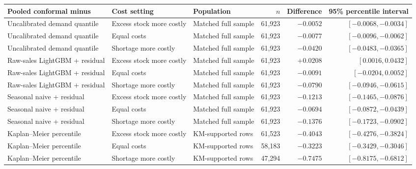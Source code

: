 \begin{tabular}{@{}lllrrr@{}}
\toprule
Pooled conformal minus & Cost setting & Population & $n$ & Difference & 95\% percentile interval \\
\midrule
Uncalibrated demand quantile & Excess stock more costly & Matched full sample & 61,923 & $-0.0052$ & $[-0.0068, -0.0034]$ \\
Uncalibrated demand quantile & Equal costs & Matched full sample & 61,923 & $-0.0077$ & $[-0.0096, -0.0062]$ \\
Uncalibrated demand quantile & Shortage more costly & Matched full sample & 61,923 & $-0.0420$ & $[-0.0483, -0.0365]$ \\
\addlinespace
Raw-sales LightGBM + residual & Excess stock more costly & Matched full sample & 61,923 & $+0.0208$ & $[0.0016, 0.0432]$ \\
Raw-sales LightGBM + residual & Equal costs & Matched full sample & 61,923 & $-0.0091$ & $[-0.0204, 0.0052]$ \\
Raw-sales LightGBM + residual & Shortage more costly & Matched full sample & 61,923 & $-0.0790$ & $[-0.0946, -0.0615]$ \\
\addlinespace
Seasonal naive + residual & Excess stock more costly & Matched full sample & 61,923 & $-0.1213$ & $[-0.1465, -0.0876]$ \\
Seasonal naive + residual & Equal costs & Matched full sample & 61,923 & $-0.0694$ & $[-0.0872, -0.0439]$ \\
Seasonal naive + residual & Shortage more costly & Matched full sample & 61,923 & $-0.1376$ & $[-0.1723, -0.0902]$ \\
\addlinespace
Kaplan--Meier percentile & Excess stock more costly & KM-supported rows & 61,523 & $-0.4043$ & $[-0.4276, -0.3824]$ \\
Kaplan--Meier percentile & Equal costs & KM-supported rows & 58,183 & $-0.3223$ & $[-0.3429, -0.3046]$ \\
Kaplan--Meier percentile & Shortage more costly & KM-supported rows & 47,294 & $-0.7475$ & $[-0.8175, -0.6812]$ \\
\bottomrule
\end{tabular}
